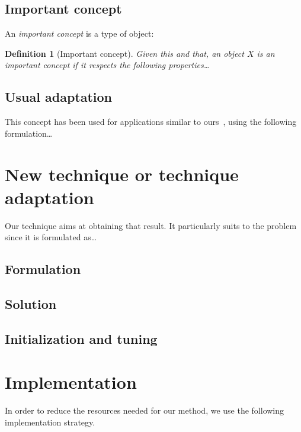 \documentclass[10pt, conference]{IEEEtran}
\newtheorem{definition}{Definition}
\begin{document}
\subsection{Important concept}
%
An \emph{important concept} is a type of object:
\begin{definition}[Important concept]
Given this and that, an object $X$ is an important concept if it respects the following properties\ldots{}
\end{definition}


\subsection{Usual adaptation}
%
This concept has been used for applications similar to ours~\cite{Sibgrapi2015}, using the following formulation\ldots{}



\section{New technique or technique adaptation}
\label{sec:technique}
%
Our technique aims at obtaining that result. It particularly suits to the problem since it is formulated as\ldots{}


\subsection{Formulation}


\subsection{Solution}


\subsection{Initialization and tuning}



\section{Implementation}
%
In order to reduce the resources needed for our method, we use the following implementation strategy.
\end{document}
